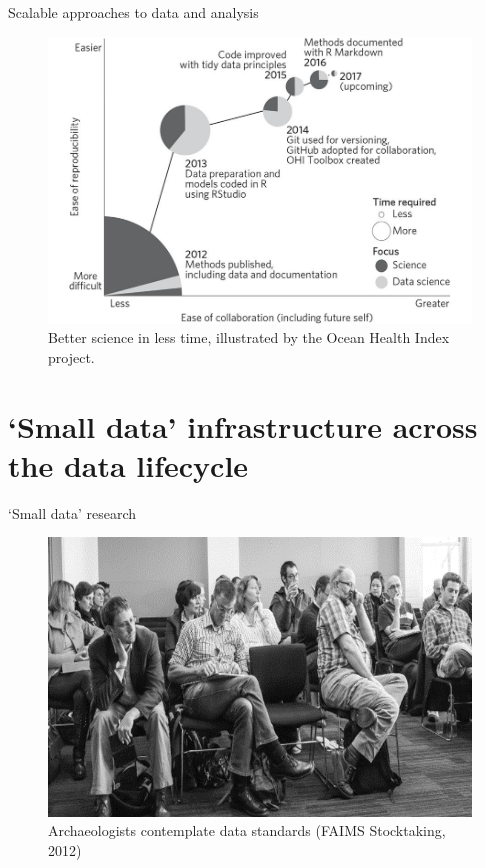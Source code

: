 \documentclass[aspectratio=169, 12pt]{beamer} %
\begin{document}
\begin{frame}{Scalable approaches to data and analysis}
  \begin{figure}[H]
    \centering
        \includegraphics[height=.7\textheight]{figures/Ocean-Health-Index.jpg}
        \caption{Better science in less time, illustrated by the Ocean Health Index project. \cite{Stewart_Lowndes2017-lj}}
        \label{fig:figure14}
  \end{figure}
\end{frame}

\section{`Small data' infrastructure across the data lifecycle}

\begin{frame}{`Small data' research}
 \begin{figure}[H]
    \centering
        \includegraphics[height=.75\textheight]{figures/Archaeologists-standards.png}
        \caption{Archaeologists contemplate data standards (FAIMS Stocktaking, 2012)}
        \label{fig:figure7}
 \end{figure}
\end{frame}
\end{document}
